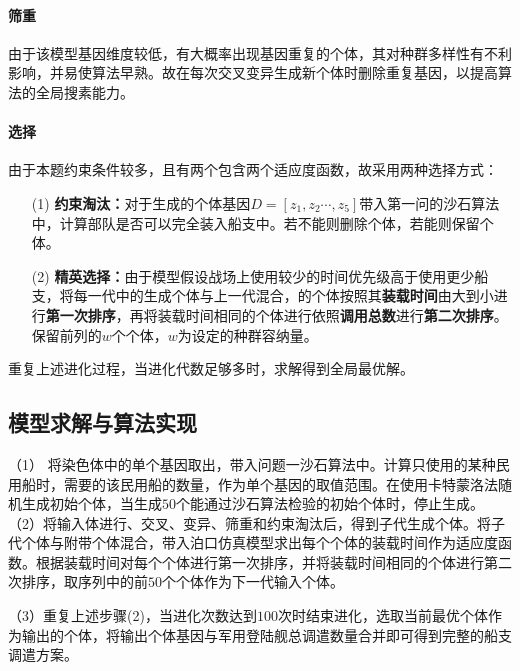 \documentclass{whutmod}
\begin{document}
     \paragraph{筛重}
     由于该模型基因维度较低，有大概率出现基因重复的个体，其对种群多样性有不利影响，并易使算法早熟。故在每次交叉变异生成新个体时删除重复基因，以提高算法的全局搜素能力。
     \paragraph{选择}
     由于本题约束条件较多，且有两个包含两个适应度函数，故采用两种选择方式：
     \begin{itemize}
     \item [(1)] \textbf{约束淘汰：}对于生成的个体基因$D=[z_{1},z_{2}\cdots,z_{5}]$带入第一问的沙石算法中，计算部队是否可以完全装入船支中。若不能则删除个体，若能则保留个体。
     \item [(2)]\textbf{精英选择：}由于模型假设战场上使用较少的时间优先级高于使用更少船支，将每一代中的生成个体与上一代混合，的个体按照其\textbf{装载时间}由大到小进行\textbf{第一次排序}，再将装载时间相同的个体进行依照\textbf{调用总数}进行\textbf{第二次排序}。保留前列的$w$个个体，$w$为设定的种群容纳量。
     \end{itemize}
     重复上述进化过程，当进化代数足够多时，求解得到全局最优解。

     \subsection{模型求解与算法实现}


   	 （1） 将染色体中的单个基因取出，带入问题一沙石算法中。计算只使用的某种民用船时，需要的该民用船的数量，作为单个基因的取值范围。在使用卡特蒙洛法随机生成初始个体，当生成$50$个能通过沙石算法检验的初始个体时，停止生成。
   	 （2）将输入体进行、交叉、变异、筛重和约束淘汰后，得到子代生成个体。将子代个体与附带个体混合，带入泊口仿真模型求出每个个体的装载时间作为适应度函数。根据装载时间对每个个体进行第一次排序，并将装载时间相同的个体进行第二次排序，取序列中的前$50$个个体作为下一代输入个体。

   （3）重复上述步骤(2)，当进化次数达到$100$次时结束进化，选取当前最优个体作为输出的个体，将输出个体基因与军用登陆舰总调遣数量合并即可得到完整的船支调遣方案。
\end{document}
